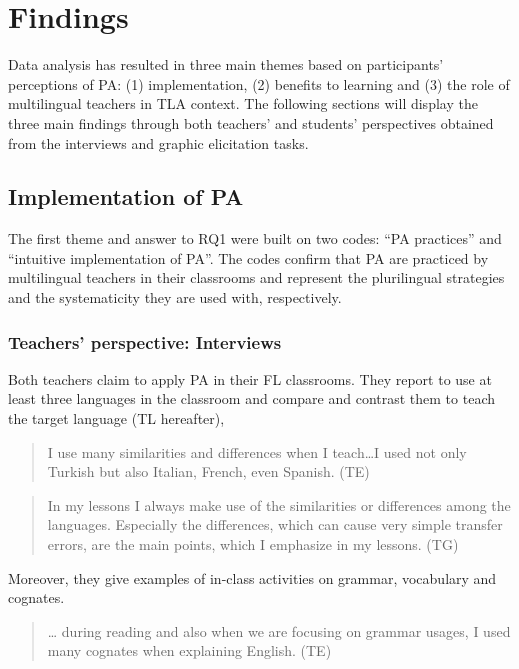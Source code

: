 \documentclass[output=paper]{../langscibook}
\begin{document}
\section{Findings}


Data analysis has resulted in three main themes based on participants’ perceptions of PA: (1) implementation, (2) benefits to learning and (3) the role of multilingual teachers in TLA context. The following sections will display the three main findings through both teachers’ and students’ perspectives obtained from the interviews and graphic elicitation tasks.



\subsection{Implementation of PA}
\label{sec:kucukali:1}


The first theme and answer to RQ1 were built on two codes: “PA practices” and “intuitive implementation of PA”. The codes confirm that PA are practiced by multilingual teachers in their classrooms and represent the plurilingual strategies and the systematicity they are used with, respectively.


\subsubsection{Teachers’ perspective: Interviews}


Both teachers claim to apply PA in their FL classrooms. They report to use at least three languages in the classroom and compare and contrast them to teach the target language (TL hereafter),

\begin{quote}
I use many similarities and differences when I teach…I used not only Turkish but also Italian, French, even Spanish. (TE) 
\end{quote}

\begin{quote}
In my lessons I always make use of the similarities or differences among the languages. Especially the differences, which can cause very simple transfer errors, are the main points, which I emphasize in my lessons. (TG) 
\end{quote}

\noindent Moreover, they give examples of in-class activities on grammar, vocabulary and cognates. 

\begin{quote}
… during reading and also when we are focusing on grammar usages, I used many cognates when explaining English. (TE) 
\end{quote}
\end{document}
